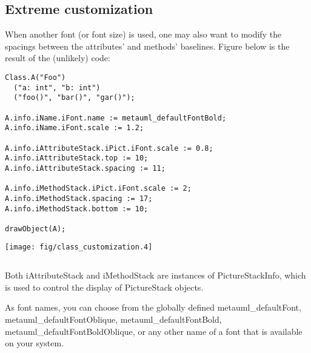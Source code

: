 \documentclass{article}
\newcommand{\code}{\ttfamily}
\begin{document}
\subsection{Extreme customization}

When another font (or font size) is used, one may also want to modify the spacings between the
attributes' and methods' baselines. Figure below is the result of the
(unlikely) code:

\begin{multicols}{2}
\begin{verbatim}
Class.A("Foo")
  ("a: int", "b: int")
  ("foo()", "bar()", "gar()");

A.info.iName.iFont.name := metauml_defaultFontBold;
A.info.iName.iFont.scale := 1.2;

A.info.iAttributeStack.iPict.iFont.scale := 0.8;
A.info.iAttributeStack.top := 10;
A.info.iAttributeStack.spacing := 11;

A.info.iMethodStack.iPict.iFont.scale := 2;
A.info.iMethodStack.spacing := 17;
A.info.iMethodStack.bottom := 10;

drawObject(A);
\end{verbatim}
\columnbreak
\hspace{4cm}\texttt{[image: fig/class\_customization.4]}
\end{multicols}

\begin{verbatim}
\end{verbatim}

Both {\code iAttributeStack} and {\code iMethodStack} are instances of
{\code PictureStackInfo}, which is used to control the display of {\code PictureStack} objects.

As font names, you can choose from the globally defined {\code metauml\_defaultFont}, {\code metauml\_defaultFontOblique}, {\code metauml\_defaultFontBold}, {\code metauml\_defaultFontBoldOblique}, or any other name of a font that is available on your system.



\end{document}
